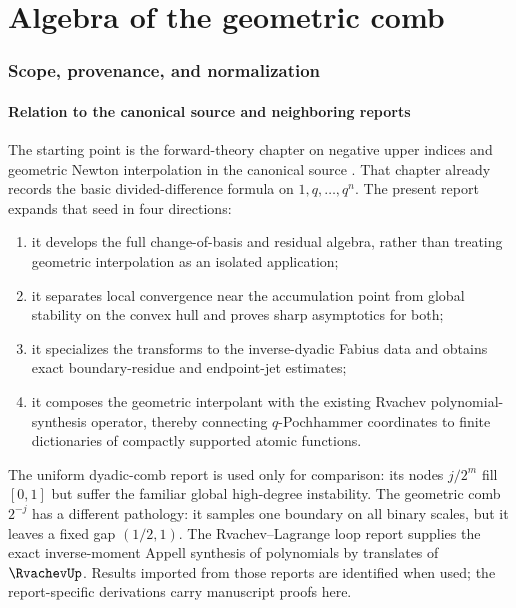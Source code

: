 \part{Algebra of the geometric comb}

\section{Scope, provenance, and normalization}
\label{gq:chap:scope}

\subsection{Relation to the canonical source and neighboring reports}

The starting point is the forward-theory chapter on negative upper indices
and geometric Newton interpolation in the canonical source
.  That chapter already records the
basic divided-difference formula on $1,q,\ldots,q^n$.  The present report
expands that seed in four directions:

\begin{enumerate}
\item it develops the full change-of-basis and residual algebra, rather than
      treating geometric interpolation as an isolated application;
\item it separates local convergence near the accumulation point from global
      stability on the convex hull and proves sharp asymptotics for both;
\item it specializes the transforms to the inverse-dyadic Fabius data and
      obtains exact boundary-residue and endpoint-jet estimates;
\item it composes the geometric interpolant with the existing Rvachev
      polynomial-synthesis operator, thereby connecting $q$-Pochhammer
      coordinates to finite dictionaries of compactly supported atomic
      functions.
\end{enumerate}

The uniform dyadic-comb report is used only for comparison: its nodes
$j/2^m$ fill $[0,1]$ but suffer the familiar global high-degree instability.
The geometric comb $2^{-j}$ has a different pathology: it samples one
boundary on all binary scales, but it leaves a fixed gap $(1/2,1)$.  The
Rvachev--Lagrange loop report supplies the exact inverse-moment Appell
synthesis of polynomials by translates of $\RvachevUp$.  Results imported from those
reports are identified when used; the report-specific derivations carry
manuscript proofs here.

